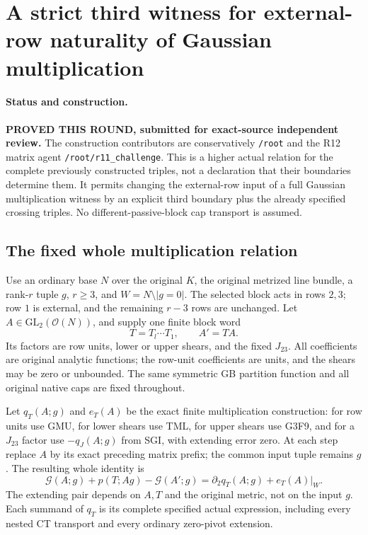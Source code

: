 \section{A strict third witness for external-row naturality of Gaussian multiplication}
\label{sec:r12-gaussian-multiplication-external-naturality}

\paragraph{Status and construction.}
\textbf{PROVED THIS ROUND, submitted for exact-source independent
review.}  The construction contributors are conservatively
\texttt{/root} and the R12 matrix agent
\texttt{/root/r11\_challenge}.  This is a higher actual relation
for the complete previously constructed triples, not a declaration
that their boundaries determine them.  It permits changing the
external-row input of a full Gaussian multiplication witness by
an explicit third boundary plus the already specified crossing
triples.  No different-passive-block cap transport is assumed.

\subsection{The fixed whole multiplication relation}

Use an ordinary base $N$ over the original $K$, the original
metrized line bundle, a rank-$r$ tuple $g$, $r\ge3$, and
$W=N\setminus|g=0|$.  The selected block acts in rows $2,3$;
row $1$ is external, and the remaining $r-3$ rows are unchanged.
Let $A\in\mathrm{GL}_2(\mathcal O(N))$, and supply one finite
block word
\[
                      T=T_l\cdots T_1,\qquad A'=TA.
 \tag{GNT1}
\]
Its factors are row units, lower or upper shears, and the fixed
$J_{23}$.  All coefficients are original analytic functions;
the row-unit coefficients are units, and the shears may be zero
or unbounded.  The same symmetric GB partition function and
all original native caps are fixed throughout.

Let $q_T(A;g)$ and $e_T(A)$ be the exact finite multiplication
construction: for row units use GMU, for lower shears use TML,
for upper shears use G3F9, and for a $J_{23}$ factor use
$-q_J(A;g)$ from SGI, with extending error zero.  At each step
replace $A$ by its exact preceding matrix prefix; the common
input tuple remains $g$.  The resulting whole identity is
\[
 \mathcal G(A;g)+p(T;Ag)-\mathcal G(A';g)
                =\partial_2q_T(A;g)+e_T(A)|_W.
 \tag{GNT2}
\]
The extending pair depends on $A,T$ and the original metric, not
on the input $g$.  Each summand of $q_T$ is its complete specified
actual expression, including every nested CT transport and every
ordinary zero-pivot extension.

